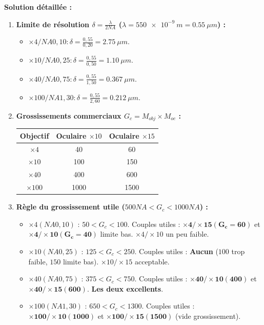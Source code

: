 \documentclass[11pt]{article}
\begin{document}
\begin{exoresolu}
\tcblower
\textbf{Solution détaillée :}
\begin{enumerate}
    \item \textbf{Limite de résolution $\delta = \frac{\lambda}{2 NA}$ ($\lambda = \SI{550e-9}{m} = \SI{0,55}{\mu m}$) :}
    \begin{itemize}
        \item $\times 4 / NA 0,10 : \delta = \frac{0,55}{0,20} = \SI{2,75}{\mu m}$.
        \item $\times 10 / NA 0,25 : \delta = \frac{0,55}{0,50} = \SI{1,10}{\mu m}$.
        \item $\times 40 / NA 0,75 : \delta = \frac{0,55}{1,50} = \SI{0,367}{\mu m}$.
        \item $\times 100 / NA 1,30 : \delta = \frac{0,55}{2,60} = \SI{0,212}{\mu m}$.
    \end{itemize}
    \item \textbf{Grossissements commerciaux $G_c = M_{obj} \times M_{oc}$ :}
    \begin{center}
    \begin{tabular}{|c|c|c|}\hline
    Objectif & Oculaire $\times 10$ & Oculaire $\times 15$ \\ \hline
    $\times 4$ & 40 & 60 \\
    $\times 10$ & 100 & 150 \\
    $\times 40$ & 400 & 600 \\
    $\times 100$ & 1000 & 1500 \\ \hline
    \end{tabular}
    \end{center}
    \item \textbf{Règle du grossissement utile ($500 NA < G_c < 1000 NA$) :}
    \begin{itemize}
        \item $\times 4 (NA 0,10)$ : $50 < G_c < 100$. Couples utiles : $\mathbf{\times 4 / \times 15 (G_c=60)}$ et $\mathbf{\times 4 / \times 10 (G_c=40)}$ limite bas. $\times 4/\times 10$ un peu faible.
        \item $\times 10 (NA 0,25)$ : $125 < G_c < 250$. Couples utiles : \textbf{Aucun} ($100$ trop faible, $150$ limite bas). $\times 10/\times 15$ acceptable.
        \item $\times 40 (NA 0,75)$ : $375 < G_c < 750$. Couples utiles : $\mathbf{\times 40 / \times 10 (400)}$ et $\mathbf{\times 40 / \times 15 (600)}$. \textbf{Les deux excellents}.
        \item $\times 100 (NA 1,30)$ : $650 < G_c < 1300$. Couples utiles : $\mathbf{\times 100 / \times 10 (1000)}$ et $\mathbf{\times 100 / \times 15 (1500)}$ (vide grossissement).

\end{itemize}
\end{enumerate}
\end{exoresolu}
\end{document}
